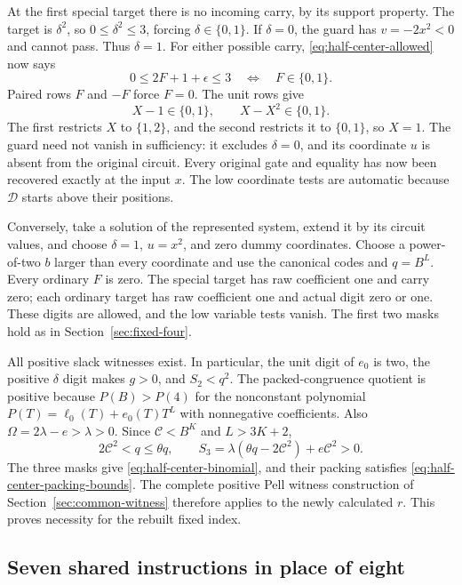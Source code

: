 At the first special target there is no incoming carry, by its
support property. The target is $\delta^2$, so
$0\le\delta^2\le3$, forcing $\delta\in\{0,1\}$. If $\delta=0$,
the guard has $v=-2x^2<0$ and cannot pass. Thus $\delta=1$.
For either possible carry, \eqref{eq:half-center-allowed} now says
\[
 0\le2F+1+\epsilon\le3
 \quad\Longleftrightarrow\quad F\in\{0,1\}.
\]
Paired rows $F$ and $-F$ force $F=0$. The unit rows give
\[
 X-1\in\{0,1\},\qquad X-X^2\in\{0,1\}.
\]
The first restricts $X$ to $\{1,2\}$, and the second restricts it
to $\{0,1\}$, so $X=1$. The guard need not vanish in sufficiency:
it excludes $\delta=0$, and its coordinate $u$ is absent from the
original circuit. Every original gate and equality has now been
recovered exactly at the input $x$. The low coordinate tests are
automatic because $\mathcal D$ starts above their positions.

Conversely, take a solution of the represented system, extend it by
its circuit values, and choose $\delta=1$, $u=x^2$, and zero dummy
coordinates. Choose a power-of-two $b$ larger than every coordinate
and use the canonical codes and $q=B^L$. Every ordinary $F$ is
zero. The special target has raw coefficient one and carry zero;
each ordinary target has raw coefficient one and actual digit zero
or one. These digits are allowed, and the low variable tests vanish.
The first two masks hold as in Section~\ref{sec:fixed-four}.

All positive slack witnesses exist. In particular, the unit digit
of $e_0$ is two, the positive $\delta$ digit makes $g>0$, and
$S_2<q^2$. The packed-congruence quotient is positive because
$P(B)>P(4)$ for the nonconstant polynomial
$P(T)=\ell_0(T)+e_0(T)T^L$ with nonnegative coefficients.
Also $\Omega=2\lambda-e>\lambda>0$. Since
$\mathcal C<B^K$ and $L>3K+2$,
\[
 2\mathcal C^2<q\le\theta q,
 \qquad
 S_3=\lambda(\theta q-2\mathcal C^2)+e\mathcal C^2>0.
\]
The three masks give \eqref{eq:half-center-binomial}, and their
packing satisfies \eqref{eq:half-center-packing-bounds}. The complete
positive Pell witness construction of Section~\ref{sec:common-witness}
therefore applies to the newly calculated $r$. This proves necessity
for the rebuilt fixed index.

\subsection{Seven shared instructions in place of eight}

